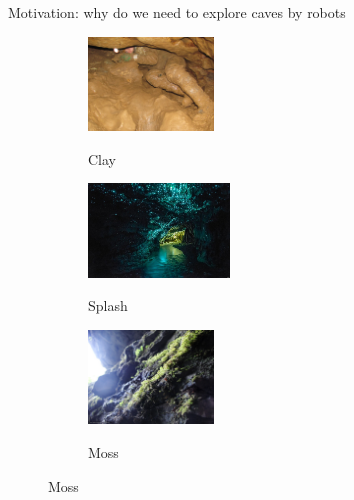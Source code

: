 \documentclass[aspectratio=169]{beamer}
\begin{document}
\begin{frame}[t]{Motivation: why do we need to explore caves by robots}
\begin{figure}[H]
        \begin{subfigure}[b]{0.3\textwidth}
            \centering\includegraphics[height=2.5cm]{surface_types/clay.jpg}\\
            \caption*{Clay}
            \label{fig:clay}
        \end{subfigure}
        \hfill
        \begin{subfigure}[b]{0.3\textwidth}
            \centering\includegraphics[height=2.5cm]{surface_types/splash.png}\\
            \caption*{Splash}
            \label{fig:splash}
        \end{subfigure}
        \hfill
        \begin{subfigure}[b]{0.3\textwidth}
            \centering\includegraphics[height=2.5cm]{surface_types/moss.jpg}\\
            \caption*{Moss}
            \label{fig:moss}
        \end{subfigure}
    \end{figure}
\end{frame}
\end{document}
